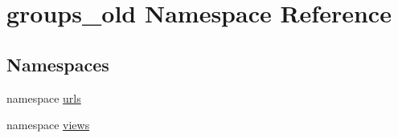 \hypertarget{namespacegroups__old}{
\section{groups\_\-old Namespace Reference}
\label{namespacegroups__old}
}
\subsection*{Namespaces}
\begin{DoxyCompactItemize}
\item 
namespace \hyperlink{namespacegroups__old_1_1urls}{urls}
\item 
namespace \hyperlink{namespacegroups__old_1_1views}{views}
\end{DoxyCompactItemize}

